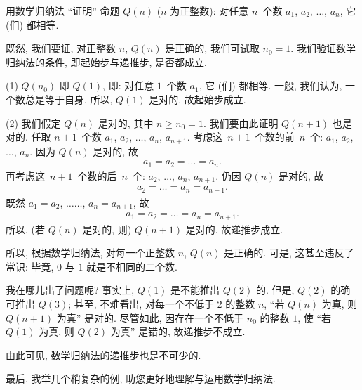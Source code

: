 \documentclass[%
    UTF8,%
    fontset=none,%
    punct=kaiming,%
    zihao=-4,%
    a4paper,%
    oneside,%
]{ctexbook}
\renewcommand*{\geq}{\geqslant}
\begin{document}
\begin{example}[缺递推步]
    用数学归纳法 ``证明'' 命题 \(Q(n)\) (\(n\) 为正整数):
    对任意 \(n\)~个数 \(a_1\), \(a_2\), \(\dots\), \(a_n\),
    它 (们) 都相等.

    既然, 我们要证, 对正整数 \(n\),
    \(Q(n)\) 是正确的,
    我们可试取 \(n_0 = 1\).
    我们验证数学归纳法的条件,
    即起始步与递推步,
    是否都成立.

    (1)
    \(Q(n_0)\) 即 \(Q(1)\), 即:
    对任意 \(1\)~个数 \(a_1\), 它 (们) 都相等.
    一般, 我们认为, 一个数总是等于自身.
    所以, \(Q(1)\) 是对的.
    故起始步成立.

    (2)
    我们假定 \(Q(n)\) 是对的, 其中 \(n \geq n_0 = 1\).
    我们要由此证明 \(Q(n+1)\) 也是对的.
    任取 \(n+1\)~个数
    \(a_1\), \(a_2\), \(\dots\), \(a_n\), \(a_{n+1}\).
    考虑这~\(n+1\)~个数的前~\(n\)~个:
    \(a_1\), \(a_2\), \(\dots\), \(a_n\).
    因为 \(Q(n)\) 是对的, 故
    \begin{align*}
        a_1 = a_2 = \dots = a_n.
    \end{align*}
    再考虑这~\(n+1\)~个数的后~\(n\)~个:
    \(a_2\), \(\dots\), \(a_n\), \(a_{n+1}\).
    仍因 \(Q(n)\) 是对的, 故
    \begin{align*}
        a_2 = \dots = a_n = a_{n+1}.
    \end{align*}
    既然 \(a_1 = a_2\), \(\dots \dots\), \(a_n = a_{n+1}\), 故
    \begin{align*}
        a_1 = a_2 = \dots = a_n = a_{n+1}.
    \end{align*}
    所以, (若 \(Q(n)\) 是对的, 则) \(Q(n+1)\) 是对的.
    故递推步成立.

    所以, 根据数学归纳法,
    对每一个正整数 \(n\), \(Q(n)\) 是正确的.
    可是, 这甚至违反了常识:
    毕竟, \(0\) 与 \(1\) 就是不相同的二个数.

    我在哪儿出了问题呢?
    事实上, \(Q(1)\) 是不能推出 \(Q(2)\) 的.
    但是, \(Q(2)\) 的确可推出 \(Q(3)\);
    甚至, 不难看出, 对每一个不低于 \(2\) 的整数 \(n\),
    ``若 \(Q(n)\) 为真, 则 \(Q(n+1)\) 为真''
    是对的.
    尽管如此,
    因存在一个不低于 \(n_0\) 的整数 \(1\),
    使 ``若 \(Q(1)\) 为真, 则 \(Q(2)\) 为真''
    是错的,
    故递推步不成立.

    由此可见, 数学归纳法的递推步也是不可少的.
\end{example}

最后, 我举几个稍复杂的例,
助您更好地理解与运用数学归纳法.
\end{document}
